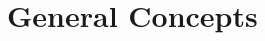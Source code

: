 \section{General Concepts}



\begin{comment}

obsolete - we have now 3 files for this content

-multivariate functions
-partial derivatives
-gradient, Jacobian, Hessian
-line integrals (of scalar function), double integrals, triple integrals
-coordinate transformations (polar, spherical, etc. -> jacobian determinant)

\end{comment} 